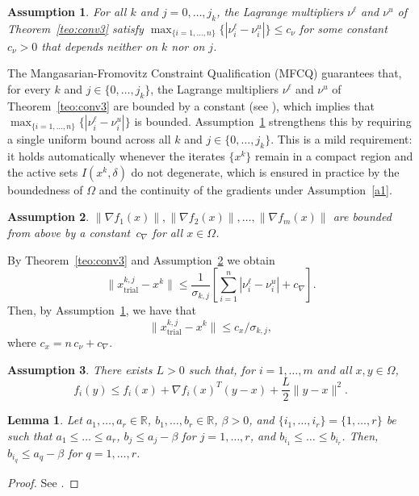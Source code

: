\documentclass[11pt]{article}
\newcommand{\R}{\mathbb{R}}
\newcommand{\xkjtrial}{x^{k,j}_{\mathrm{trial}}}
\newtheorem{lemma}{Lemma}[section]
\newtheorem{assumption}{Assumption}
\begin{document}
\begin{assumption} \label{a2}
For all $k$ and $j = 0, \ldots, j_k$, the Lagrange multipliers 
$\nu^\ell$ and $\nu^u$ of Theorem~\ref{teo:conv3} satisfy 
$\max_{\{i=1,\ldots,n\}}\{|\nu_i^\ell - \nu_i^u|\} \leq c_\nu$ 
for some constant $c_\nu > 0$ that depends neither on $k$ nor on $j$.
\end{assumption}

The Mangasarian-Fromovitz Constraint Qualification (MFCQ) guarantees 
that, for every $k$ and $j \in \{0, \ldots, j_k\}$, the Lagrange 
multipliers $\nu^\ell$ and $\nu^u$ of Theorem~\ref{teo:conv3} are 
bounded by a constant (see \cite{gauvin}), which implies that 
$\max_{\{i=1,\ldots,n\}}\{|\nu_i^\ell - \nu_i^u|\}$ is bounded. 
Assumption~\ref{a2} strengthens this by requiring a single uniform 
bound across all $k$ and $j \in \{0, \ldots, j_k\}$. This is a 
mild requirement: it holds automatically whenever the iterates 
$\{x^k\}$ remain in a compact region and the active sets 
$I(x^k, \delta)$ do not degenerate, which is ensured in practice 
by the boundedness of $\Omega$ and the continuity of the gradients 
under Assumption~\ref{a1}.

\begin{assumption} \label{a3}
$\| \nabla f_1(x) \|, \| \nabla f_2(x) \|, \dots, \| \nabla f_m(x) \|$ are bounded from above by a constant~$c_{\nabla}$ for all $x \in \Omega$.
\end{assumption}

By Theorem~\ref{teo:conv3} and Assumption~\ref{a3} we obtain
\[
\| \xkjtrial - x^k \| \leq \dfrac{1}{\sigma_{k,j}} \left[ \sum_{i=1}^n \left| \nu^\ell_i - \nu^u_i \right| + c_{\nabla} \right].
\]
Then, by Assumption~\ref{a2}, we have that
\begin{equation} \label{ccotasub}
 \| \xkjtrial - x^k \| \leq c_x / \sigma_{k,j},
\end{equation} 
where $c_x = n \, c_{\nu} + c_{\nabla}$.

\begin{assumption} \label{a4}
There exists $L > 0$ such that, for $i=1,\dots,m$ and all $x,y \in \Omega$,
\begin{equation} \label{taylor}
f_i(y) \leq f_i(x) + \nabla f_i(x)^T (y - x) + \dfrac{L}{2}\|y - x\|^2.
\end{equation}
\end{assumption}

\begin{lemma} \label{lem1}
Let $a_1, \dots, a_r \in \R$, $b_1, \dots, b_r \in \R$, $\beta > 0$, and $\{i_1, \dots, i_r\} = \{1, \dots, r \}$ be such that $a_1 \leq \dots \leq a_r$, $b_j \leq a_j - \beta$ for $j = 1, \dots, r$, and $b_{i_1} \leq \dots \leq b_{i_r}$. Then, $b_{i_q} \leq a_q - \beta$ for $q=1,\dots,r$.
\end{lemma}
\begin{proof}
See \cite{dunder1}.
\end{proof}
\end{document}
